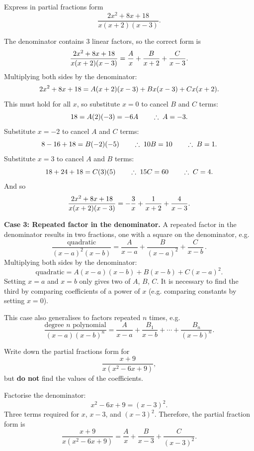 \goodbreak 
\begin{example}[Video]
Express in partial fractions form
\[
\frac{2x^2+8x+18}{x(x+2)(x-3)}.
\]
\end{example}
%
\begin{solution}
The denominator contains 3 linear factors, so the correct form is
\[
\frac{2x^2+8x+18}{x(x+2)(x-3)}=\frac{A}{x}+\frac{B}{x+2}+\frac{C}{x-3}.
\]
Multiplying both sides by the denominator:
\[
2x^2+8x+18=A(x+2)(x-3)+Bx(x-3)+Cx(x+2).
\]
This must hold for all $x$, so substitute $x=0$ to cancel $B$ and $C$ terms:
\[
18=A(2)(-3)=-6A \qquad \therefore \; A=-3.
\]
Substitute $x=-2$ to cancel $A$ and $C$ terms:
\[
8-16+18=B(-2)(-5) \qquad \therefore \; 10B=10 \qquad \therefore \; B=1.
\]
Substitute $x=3$ to cancel $A$ and $B$ terms:
\[
18+24+18=C(3)(5) \qquad \therefore \; 15C=60 \qquad \therefore \; C=4.
\]
And so
\[
\frac{2x^2+8x+18}{x(x+2)(x-3)}=-\frac{3}{x}+\frac{1}{x+2}+\frac{4}{x-3}.
\]
\end{solution}

\textbf{Case 3: Repeated factor in the denominator.} A repeated factor in the denominator results in two fractions, one with a square on the denominator, e.g.
\begin{equation*}
    \frac{\text{quadratic}}{(x-a)^2(x-b)}=\frac{A}{x-a}+\frac{B}{(x-a)^2}+\frac{C}{x-b} \, .
\end{equation*}
Multiplying both sides by the denominator:
\[
\text{quadratic}=A(x-a)(x-b)+B(x-b)+C(x-a)^2.
\]
Setting $x=a$ and $x=b$ only gives two of $A$, $B$, $C$. It is necessary to find the third by comparing coefficients of a power of $x$ (e.g. comparing constants by setting $x=0$).

This case also generalises to factors repeated $n$ times, e.g.
\begin{equation}
\frac{\text{degree }n\text{ polynomial}}{(x-a)(x-b)^n}=\frac{A}{x-a}+\frac{B_1}{x-b}+\cdots+\frac{B_n}{(x-b)^n}.
\end{equation}

\goodbreak 
\begin{example}[DIY]
Write down the partial fractions form for
\[
\frac{x+9}{x(x^2-6x+9)},
\]
but \textbf{do not} find the values of the coefficients.
\end{example}
%
\begin{blanksol}
Factorise the denominator:
\[
x^2-6x+9=(x-3)^2.
\]
Three terms required for $x$, $x-3$, and $(x-3)^2$. Therefore, the partial fraction form is
\[
\frac{x+9}{x(x^2-6x+9)}=\frac{A}{x}+\frac{B}{x-3}+\frac{C}{(x-3)^2}.
\]
\end{blanksol}

